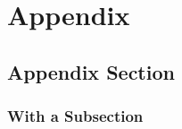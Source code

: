\documentclass[hidelinks,11pt,a4paper,oneside,article]{memoir}
\begin{document}
	\chapter{Appendix}\label{appx:first}
	
	
	
	
	
	\section{Appendix Section}
	
	
	\subsection{With a Subsection}
	
	\clearpage %
\end{document}
